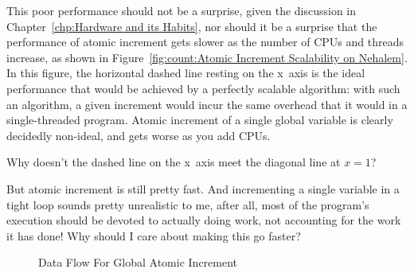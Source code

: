 This poor performance should not be a surprise, given the discussion in
Chapter~\ref{chp:Hardware and its Habits},
nor should it be a surprise that the performance of atomic increment
gets slower as the number of CPUs and threads increase, as shown in
Figure~\ref{fig:count:Atomic Increment Scalability on Nehalem}.
In this figure, the horizontal dashed line resting on the x~axis
is the ideal performance that would be achieved
by a perfectly scalable algorithm: with such an algorithm, a given
increment would incur the same overhead that it would in a single-threaded
program.
Atomic increment of a single global variable is clearly
decidedly non-ideal, and gets worse as you add CPUs.

\QuickQuiz{}
	Why doesn't the dashed line on the x~axis meet the 
	diagonal line at $x=1$?
 \QuickQuizEnd

\QuickQuiz{}
	But atomic increment is still pretty fast.
	And incrementing a single variable in a tight loop sounds
	pretty unrealistic to me, after all, most of the program's
	execution should be devoted to actually doing work, not accounting
	for the work it has done!
	Why should I care about making this go faster?
 \QuickQuizEnd

\begin{figure}[tb]
\begin{center}
\end{center}
\caption{Data Flow For Global Atomic Increment}
\label{fig:count:Data Flow For Global Atomic Increment}
\end{figure}

